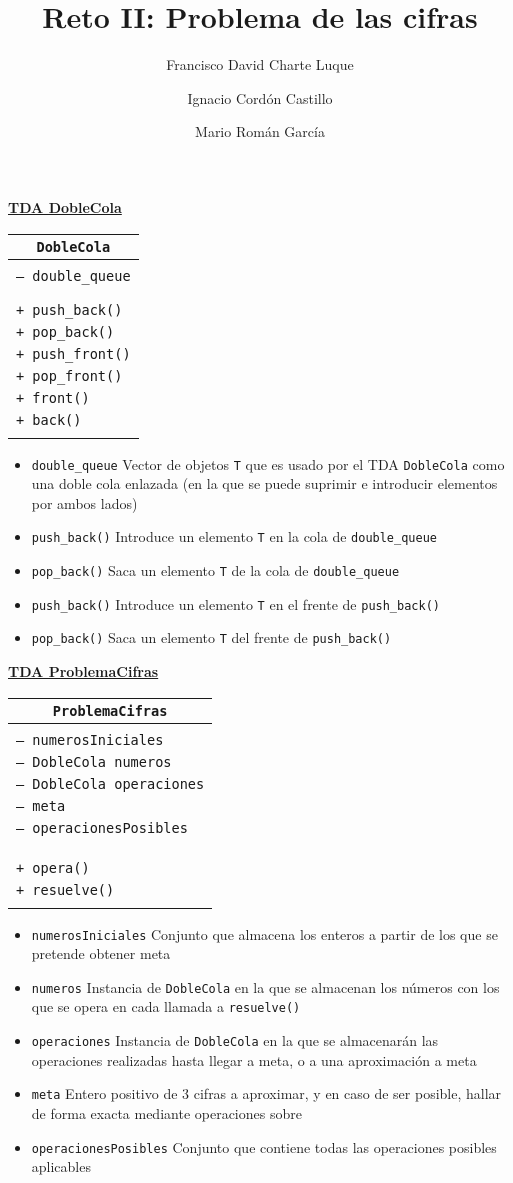 \documentclass[a4paper,10pt]{scrartcl}
\title{Reto II: Problema de las cifras}
\author{Francisco David Charte Luque \and 
        Ignacio Cordón Castillo \and
        Mario Román García}
\date{}
\newcommand{\objeto}[4]{\underline{\textbf{TDA #1}}
            \begin{center}\begin{tabular}{|p{7cm}|}
                 \hline
                 \multicolumn{1}{|c|}{\texttt{#1}}\\
                 \hline
                  \\#2\\\\
                 \hline
                 \\#3\\\\
                 \hline
            \end{tabular}\end{center}
            \begin{itemize}
            #4
            \end{itemize}
               }
\def\C++#1{\texttt{#1}}
\def\T_{\texttt{T}}
\begin{document}
\maketitle

    \objeto{DobleCola}{\C++{-- double\_queue}}
                {\C++{+ push\_back()}\\
                 \C++{+ pop\_back()}\\
                 \C++{+ push\_front()}\\
                 \C++{+ pop\_front()}\\
                 \C++{+ front()}\\
                 \C++{+ back()}}{
 \item \C++{double\_queue} Vector de objetos \T_ que es usado por
  el TDA \C++{DobleCola} como una doble cola enlazada (en la que
  se puede suprimir e introducir elementos por ambos lados)
 \item \C++{push\_back()} Introduce un elemento \T_ en la cola de
  \C++{double\_queue}
 \item \C++{pop\_back()} Saca un elemento \T_ de la cola de 
  \C++{double\_queue}
 \item \C++{push\_back()} Introduce un elemento \T_ en el frente
  de \C++{push\_back()}
 \item \C++{pop\_back()} Saca un elemento \T_ del frente de 
  \C++{push\_back()}}  
  
 \objeto{ProblemaCifras}{\C++{-- numerosIniciales}\\
                        \C++{-- DobleCola numeros}\\
                        \C++{-- DobleCola operaciones}\\
                        \C++{-- meta}\\
                        \C++{-- operacionesPosibles}\\
                        }
                        {\C++{+ opera()}\\
                        \C++{+ resuelve()}}{
  \item \C++{numerosIniciales} Conjunto que almacena los enteros
   a partir de los que se pretende obtener meta
  \item \C++{numeros} Instancia de \C++{DobleCola} en la que se
   almacenan los números con los que se opera en cada llamada
   a \C++{resuelve()}
  \item \C++{operaciones} Instancia de \C++{DobleCola} en la que
   se almacenarán las operaciones realizadas hasta llegar a meta,
   o a una aproximación a meta
  \item \C++{meta} Entero positivo de 3 cifras a aproximar, y en
   caso de ser posible, hallar de forma exacta mediante operaciones sobre
  \item \C++{operacionesPosibles} Conjunto que contiene todas las
   operaciones posibles aplicables}       
\end{document}
